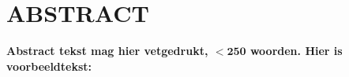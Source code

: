 \section*{ABSTRACT}
\textbf{Abstract tekst mag hier vetgedrukt, $\mathbf{< 250}$ woorden. 
Hier is voorbeeldtekst: \lipsum[1-1]}
